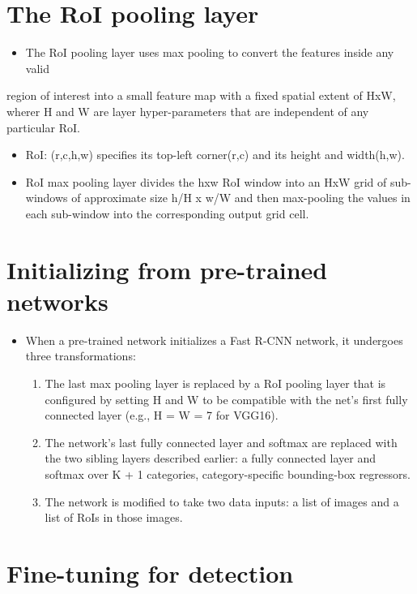 \documentclass[11pt]{book}
\begin{document}
\section{The RoI pooling layer}
\label{sec-1-1-1}

\begin{itemize}
\item The RoI pooling layer uses max pooling to convert the features inside any valid
\end{itemize}
    region of interest into a small feature map with a fixed spatial extent of HxW,
    wherer H and W are layer hyper-parameters that are independent of any particular RoI.

\begin{itemize}
\item RoI: (r,c,h,w) specifies its top-left corner(r,c) and its height and width(h,w).
\item RoI max pooling layer divides the hxw RoI window into an HxW grid of sub-windows of
      approximate size h/H x w/W and then max-pooling the values in each sub-window into 
      the corresponding output grid cell.
\end{itemize}
\section{Initializing from pre-trained networks}
\label{sec-1-1-2}


\begin{itemize}
\item When a pre-trained network initializes a Fast R-CNN network, it undergoes three
      transformations:
\begin{enumerate}
\item The last max pooling layer is replaced by a RoI pooling layer that is configured
         by setting H and W to be compatible with the net's first fully connected layer
         (e.g., H = W = 7 for VGG16).
\item The network's last fully connected layer and softmax are replaced with the two 
         sibling layers described earlier: a fully connected layer and softmax over K + 1
         categories, category-specific bounding-box regressors.
\item The network is modified to take two data inputs: a list of images and a list of
         RoIs in those images.
\end{enumerate}
\end{itemize}
\section{Fine-tuning for detection}
\label{sec-1-1-3}
\end{document}
